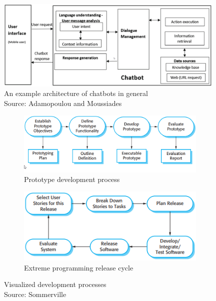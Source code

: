 \begin{figure}[t]
\centering
\captionsetup{justification=centering}
\includegraphics[width=0.98\textwidth]{graphics/chatbot-architecture-general.png}
\caption{An example architecture of chatbots in general \\Source: Adamopoulou and Moussiades \cite{adamopoulou_overview_2020}}
\label{fig:chatbot-architecture-general}
\end{figure}

\begin{figure}[h]
\centering
  \begin{subfigure}{.7\textwidth}
    \includegraphics[width=\textwidth]{graphics/prototype-dev.png}
    \caption{Prototype development process}
    \label{fig:prototype-process}
  \end{subfigure} \hfill
  \begin{subfigure}{.63\textwidth}
    \includegraphics[width=\textwidth]{graphics/extreme-programming-release-cycle.png}
    \caption{Extreme programming release cycle}
    \label{fig:extreme-prog-cycle}
    \end{subfigure}
  \caption{Visualized development processes \\ Source: Sommerville \cite{sommerville_software_2011}}
  \label{fig:dev-processes}
\end{figure}

